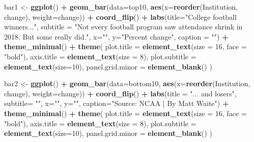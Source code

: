 \documentclass[
]{book}
\newenvironment{Shaded}{\begin{snugshade}}{\end{snugshade}}
\newcommand{\DataTypeTok}[1]{\textcolor[rgb]{0.13,0.29,0.53}{#1}}
\newcommand{\DecValTok}[1]{\textcolor[rgb]{0.00,0.00,0.81}{#1}}
\newcommand{\KeywordTok}[1]{\textcolor[rgb]{0.13,0.29,0.53}{\textbf{#1}}}
\newcommand{\NormalTok}[1]{#1}
\newcommand{\OperatorTok}[1]{\textcolor[rgb]{0.81,0.36,0.00}{\textbf{#1}}}
\newcommand{\StringTok}[1]{\textcolor[rgb]{0.31,0.60,0.02}{#1}}
\begin{document}
\begin{Shaded}
\begin{Highlighting}[]
\NormalTok{bar1 <-}\StringTok{ }\KeywordTok{ggplot}\NormalTok{() }\OperatorTok{+}\StringTok{ }\KeywordTok{geom_bar}\NormalTok{(}\DataTypeTok{data=}\NormalTok{top10, }\KeywordTok{aes}\NormalTok{(}\DataTypeTok{x=}\KeywordTok{reorder}\NormalTok{(Institution, change), }\DataTypeTok{weight=}\NormalTok{change)) }\OperatorTok{+}\StringTok{ }\KeywordTok{coord_flip}\NormalTok{() }\OperatorTok{+}\StringTok{ }\KeywordTok{labs}\NormalTok{(}\DataTypeTok{title=}\StringTok{"College football winners..."}\NormalTok{, }\DataTypeTok{subtitle =} \StringTok{"Not every football program saw attendance shrink in 2018. But some really did."}\NormalTok{,  }\DataTypeTok{x=}\StringTok{""}\NormalTok{, }\DataTypeTok{y=}\StringTok{"Percent change"}\NormalTok{, }\DataTypeTok{caption =} \StringTok{""}\NormalTok{) }\OperatorTok{+}\StringTok{ }\KeywordTok{theme_minimal}\NormalTok{() }\OperatorTok{+}\StringTok{ }
\StringTok{  }\KeywordTok{theme}\NormalTok{(}
    \DataTypeTok{plot.title =} \KeywordTok{element_text}\NormalTok{(}\DataTypeTok{size =} \DecValTok{16}\NormalTok{, }\DataTypeTok{face =} \StringTok{"bold"}\NormalTok{),}
    \DataTypeTok{axis.title =} \KeywordTok{element_text}\NormalTok{(}\DataTypeTok{size =} \DecValTok{8}\NormalTok{), }
    \DataTypeTok{plot.subtitle =} \KeywordTok{element_text}\NormalTok{(}\DataTypeTok{size=}\DecValTok{10}\NormalTok{), }
    \DataTypeTok{panel.grid.minor =} \KeywordTok{element_blank}\NormalTok{()}
\NormalTok{    )}
\end{Highlighting}
\end{Shaded}

\begin{Shaded}
\begin{Highlighting}[]
\NormalTok{bar2 <-}\StringTok{ }\KeywordTok{ggplot}\NormalTok{() }\OperatorTok{+}\StringTok{ }\KeywordTok{geom_bar}\NormalTok{(}\DataTypeTok{data=}\NormalTok{bottom10, }\KeywordTok{aes}\NormalTok{(}\DataTypeTok{x=}\KeywordTok{reorder}\NormalTok{(Institution, change), }\DataTypeTok{weight=}\NormalTok{change)) }\OperatorTok{+}\StringTok{ }\KeywordTok{coord_flip}\NormalTok{() }\OperatorTok{+}\StringTok{  }\KeywordTok{labs}\NormalTok{(}\DataTypeTok{title =} \StringTok{"... and losers"}\NormalTok{, }\DataTypeTok{subtitle=} \StringTok{""}\NormalTok{, }\DataTypeTok{x=}\StringTok{""}\NormalTok{, }\DataTypeTok{y=}\StringTok{""}\NormalTok{,  }\DataTypeTok{caption=}\StringTok{"Source: NCAA | By Matt Waite"}\NormalTok{) }\OperatorTok{+}\StringTok{ }\KeywordTok{theme_minimal}\NormalTok{() }\OperatorTok{+}\StringTok{ }
\StringTok{  }\KeywordTok{theme}\NormalTok{(}
    \DataTypeTok{plot.title =} \KeywordTok{element_text}\NormalTok{(}\DataTypeTok{size =} \DecValTok{16}\NormalTok{, }\DataTypeTok{face =} \StringTok{"bold"}\NormalTok{),}
    \DataTypeTok{axis.title =} \KeywordTok{element_text}\NormalTok{(}\DataTypeTok{size =} \DecValTok{8}\NormalTok{), }
    \DataTypeTok{plot.subtitle =} \KeywordTok{element_text}\NormalTok{(}\DataTypeTok{size=}\DecValTok{10}\NormalTok{), }
    \DataTypeTok{panel.grid.minor =} \KeywordTok{element_blank}\NormalTok{()}
\NormalTok{    )}
\end{Highlighting}
\end{Shaded}
\end{document}
